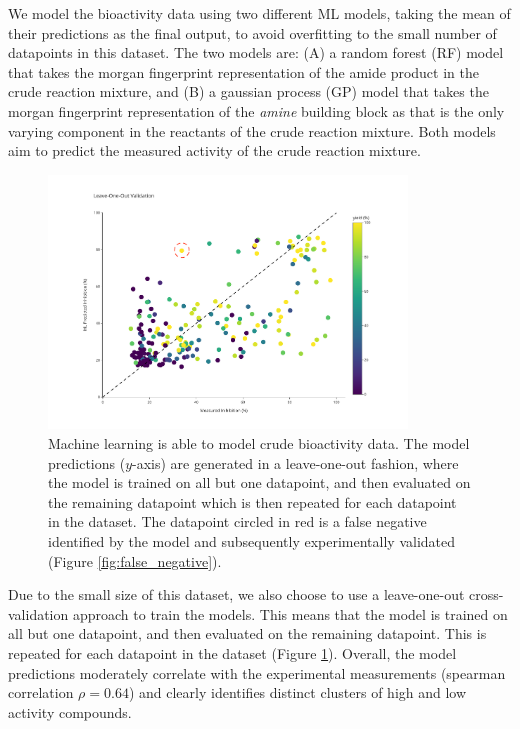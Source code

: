 We model the bioactivity data using two different ML models, taking the mean of their predictions as the final output, to avoid overfitting to the small number of datapoints in this dataset. The two models are: (A) a random forest (RF) model that takes the morgan fingerprint representation of the amide product in the crude reaction mixture, and (B) a gaussian process (GP) model that takes the morgan fingerprint representation of the \textit{amine} building block as that is the only varying component in the reactants of the crude reaction mixture. Both models aim to predict the measured activity of the crude reaction mixture.

\begin{figure}[!t]
    \centering
    \includegraphics[width=0.85\textwidth]{Chapters/Crude/Figs/rf_loo_flat.pdf}
    \caption{Machine learning is able to model crude bioactivity data. The model predictions ($y$-axis) are generated in a leave-one-out fashion, where the model is trained on all but one datapoint, and then evaluated on the remaining datapoint which is then repeated for each datapoint in the dataset. The datapoint circled in red is a false negative identified by the model and subsequently experimentally validated (Figure \ref{fig:false_negative}).}
    \label{fig:leave-one-out}
\end{figure}


Due to the small size of this dataset, we also choose to use a leave-one-out cross-validation approach to train the models. This means that the model is trained on all but one datapoint, and then evaluated on the remaining datapoint. This is repeated for each datapoint in the dataset (Figure \ref{fig:leave-one-out}). Overall, the model predictions moderately correlate with the experimental measurements (spearman correlation $\rho =0.64$) and clearly identifies distinct clusters of high and low activity compounds. 

